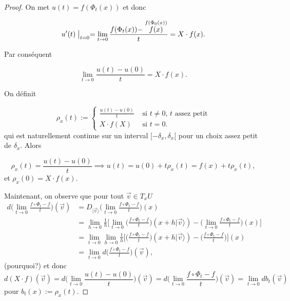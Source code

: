 \documentclass[french]{article}
\theoremstyle{definition}
\begin{document}
\begin{proof}
  On met \(u(t) = f(\Phi_t(x))\) et donc

  \[u'(t)\bigm|_{t=0} = \lim_{t \to 0} \frac{f(\Phi_t(x))-\stackrel{f(\Phi_0(x))}{f(x)}}{t} = X \cdot f(x). \]

  Par conséquent

  \[\lim_{t \to 0} \frac{u(t)-u(0)}{t} = X \cdot f(x).\]

On d\'efinit

  \[\rho_x(t) := \begin{cases}
    \displaystyle \frac{u(t)-u(0)}{t} & \text{ si } t \neq 0,\, t \text{ assez petit} \\
    X \cdot f(X) &  \text{ si } t=0.
  \end{cases}\] qui est naturellement continue sur un interval \([-\delta_x, \delta_x[\) pour un choix assez petit de $\delta_x$.  Alors

  \[\rho_x(t) = \frac{u(t)-u(0)}{t} \implies u(t)=u(0)+t \rho_x(t) = f(x)+ t \rho_x(t),\] et \(\rho_x(0)= X \cdot f(x).\)

  Maintenant, on observe que pour tout $\vec v \in T_xU$
   \[
   \begin{aligned}
 d \Big ( \lim_{t \to 0} \frac{f\circ \Phi_t - f}{t}   \Big )  (\vec v)
 & = D_{|\vec v\rangle}\Big ( \lim_{t \to 0} \frac{f\circ \Phi_t - f}{t}   \Big )  (x)
 \\ &  = \lim_{h\to 0} \frac 1h \Big [ \lim_{t \to 0}  \Big ( \frac{f\circ \Phi_t - f}{t}   \Big )  (x+h|\vec v\rangle ) -  \Big (\lim_{t \to 0} \frac{f\circ \Phi_t - f}{t}   \Big )(x) \Big ]
  \\ &  = \lim_{t\to 0}      \lim_{h \to 0} \frac 1h \Big [\Big ( \frac{f\circ \Phi_t - f}{t}   \Big )  (x+h|\vec v\rangle ) -  \Big (\frac{f\circ \Phi_t - f}{t}  \Big ) \Big ] (x)  \\ &
  = \lim_{t\to 0} d\Big (\frac{f\circ \Phi_t - f}{t}\Big )   (\vec v),
      \end{aligned}
 \] (pourquoi?) et donc
  \[
  d(X\cdot f) (\vec v) = d\Big ( \lim_{t \to 0} \frac{u(t)-u(0)}{t} \Big )  (\vec v)= d \Big ( \lim_{t \to 0} \frac{f\circ \Phi_t - f}{t}   \Big ) (\vec v) = \lim_{t\to 0} db_t (\vec v)
  \] pour $b_t(x) := \rho_x(t)$.
\end{proof}
\end{document}
